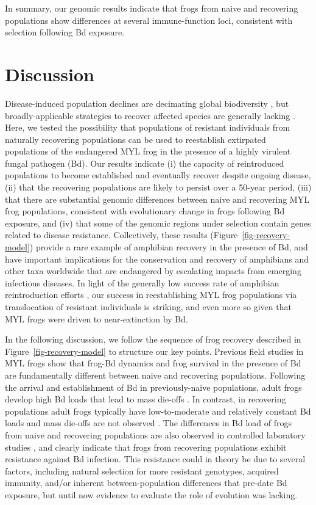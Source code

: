 \documentclass[9pt,twocolumn,twoside,lineno]{pnas-new}
\begin{document}
In summary, our genomic results indicate that frogs from naive and
recovering populations show differences at several immune-function loci,
consistent with selection following Bd exposure.

\section*{Discussion}

Disease-induced population declines are decimating global biodiversity
\citep{daszak2000}, but broadly-applicable strategies to recover
affected species are generally lacking \citep[e.g.,][]{garner2016}.
Here, we tested the possibility that populations of resistant
individuals from naturally recovering populations can be used to
reestablish extirpated populations of the endangered MYL frog in the
presence of a highly virulent fungal pathogen (Bd). Our results indicate
(i) the capacity of reintroduced populations to become established and
eventually recover despite ongoing disease, (ii) that the recovering
populations are likely to persist over a 50-year period, (iii) that
there are substantial genomic differences between naive and recovering
MYL frog populations, consistent with evolutionary change in frogs
following Bd exposure, and (iv) that some of the genomic regions under
selection contain genes related to disease resistance. Collectively,
these results (Figure~\ref{fig-recovery-model}) provide a rare example
of amphibian recovery in the presence of Bd, and have important
implications for the conservation and recovery of amphibians and other
taxa worldwide that are endangered by escalating impacts from emerging
infectious diseases. In light of the generally low success rate of
amphibian reintroduction efforts \citep{dodd2005}, our success in
reestablishing MYL frog populations via translocation of resistant
individuals is striking, and even more so given that MYL frogs were
driven to near-extinction by Bd.

In the following discussion, we follow the sequence of frog recovery
described in Figure~\ref{fig-recovery-model} to structure our key
points. Previous field studies in MYL frogs show that frog-Bd dynamics
and frog survival in the presence of Bd are fundamentally different
between naive and recovering populations. Following the arrival and
establishment of Bd in previously-naive populations, adult frogs develop
high Bd loads that lead to mass die-offs \citep{vredenburg2010}. In
contrast, in recovering populations adult frogs typically have
low-to-moderate and relatively constant Bd loads and mass die-offs are
not observed \citep[see also Figure S2]{briggs2010, knapp2011}. The differences in Bd load of frogs from
naive and recovering populations are also observed in controlled
laboratory studies \citep[see Figure 4 in][]{knapp2016}, and clearly
indicate that frogs from recovering populations exhibit resistance
against Bd infection. This resistance could in theory be due to several
factors, including natural selection for more resistant genotypes,
acquired immunity, and/or inherent between-population differences that
pre-date Bd exposure, but until now evidence to evaluate the role of
evolution was lacking.
\end{document}
